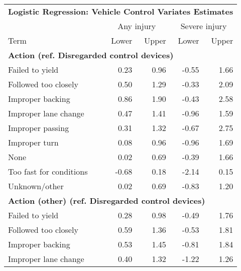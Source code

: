 \begin{tabular}{p{5cm}rrrr}
\toprule
\multicolumn{5}{l}{\normalsize\textbf{Logistic Regression: Vehicle Control Variates Estimates}}\\\addlinespace
{} & \multicolumn{2}{c}{Any injury} & \multicolumn{2}{c}{Severe injury} \\
\cmidrule(lr){2-3}
\cmidrule(l){4-5}
Term & Lower & Upper & Lower & Upper \\
\midrule
\multicolumn{5}{l}{\textbf{Action (ref. Disregarded control devices)}}\\\addlinespace
Failed to yield         &             0.23 &             0.96 &             -0.55 &             1.66 \\
Followed too closely    &             0.50 &             1.29 &             -0.33 &             2.09 \\
Improper backing        &             0.86 &             1.90 &             -0.43 &             2.58 \\
Improper lane change    &             0.47 &             1.41 &             -0.96 &             1.59 \\
Improper passing        &             0.31 &             1.32 &             -0.67 &             2.75 \\
Improper turn           &             0.08 &             0.96 &             -0.96 &             1.69 \\
None                    &             0.02 &             0.69 &             -0.39 &             1.66 \\
Too fast for conditions &            -0.68 &             0.18 &             -2.14 &             0.15 \\
Unknown/other           &             0.02 &             0.69 &             -0.83 &             1.20 \\
\midrule
\multicolumn{5}{l}{\textbf{Action (other) (ref. Disregarded control devices)}}\\\addlinespace
Failed to yield         &             0.28 &             0.98 &             -0.49 &             1.76 \\
Followed too closely    &             0.59 &             1.36 &             -0.53 &             1.81 \\
Improper backing        &             0.53 &             1.45 &             -0.81 &             1.84 \\
Improper lane change    &             0.40 &             1.32 &             -1.22 &             1.26 \\

\end{tabular}

